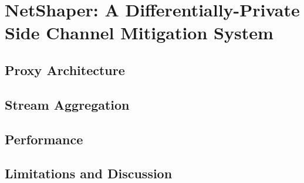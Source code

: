 \chapter{NetShaper: A Differentially-Private Side Channel Mitigation System}

\section{Proxy Architecture}\label{sec:proxy-arch}
\section{Stream Aggregation}\label{sec:stream-aggregation}
\section{Performance}\label{sec:netshaper-performance}
\section{Limitations and Discussion}\label{sec:netshaper-discussion}

\endinput